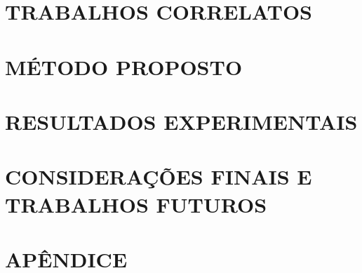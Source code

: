 \documentclass[
	12pt,				%
    oneside,			%
	a4paper,			%
	chapter=TITLE,		%
	english,			%
	brazil				%
	]{abntex2}
\begin{document}
\chapter{TRABALHOS CORRELATOS}



\chapter{MÉTODO PROPOSTO}


%

\chapter{RESULTADOS EXPERIMENTAIS}


\chapter{CONSIDERAÇÕES FINAIS E TRABALHOS FUTUROS}

\chapter{APÊNDICE}

\addto\captionsportuguese{\renewcommand{\bibname}{Referências}}
\renewcommand{\bibname}{Referências}


\end{document}
